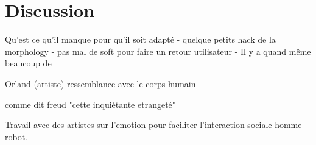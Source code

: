 \section{Discussion} %

Qu'est ce qu'il manque pour qu'il soit adapté
- quelque petits hack de la morphology
- pas mal de soft pour faire un retour utilisateur
- Il y a quand même beaucoup de


Orland (artiste)
ressemblance avec le corps humain

comme dit freud "cette inquiétante etrangeté"


Travail avec des artistes sur l'emotion pour faciliter l'interaction sociale homme-robot.











